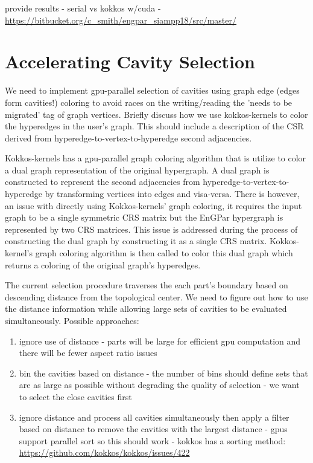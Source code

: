 \documentclass[graybox]{svmult}
\begin{document}
provide results - serial vs kokkos w/cuda -
\url{https://bitbucket.org/c_smith/engpar_siampp18/src/master/}

\section{Accelerating Cavity Selection} \label{sec:select}

We need to implement gpu-parallel selection of cavities using graph edge (edges
form cavities!) coloring to avoid races on the writing/reading the 'needs to be
migrated' tag of graph vertices.
Briefly discuss how we use kokkos-kernels to color the hyperedges in the user's graph.
This should include a description of the CSR derived from hyperedge-to-vertex-to-hyperedge
second adjacencies.

Kokkos-kernels has a gpu-parallel graph coloring algorithm that is utilize to color a dual graph representation of the original hypergraph. A dual graph is constructed to represent the second adjacencies from hyperedge-to-vertex-to-hyperedge by transforming vertices into edges and visa-versa. There is however, an issue with directly using Kokkos-kernels' graph coloring, it requires the input graph to be a single symmetric CRS matrix but the EnGPar hypergraph is represented by two CRS matrices. This issue is addressed during the process of constructing the dual graph by constructing it as a single CRS matrix. Kokkos-kernel's graph coloring algorithm is then called to color this dual graph which returns a coloring of the original graph's hyperedges.

The current selection procedure traverses the each part's boundary based on
descending distance from the topological center.
We need to figure out how to use the distance information while allowing large
sets of cavities to be evaluated simultaneously.
Possible approaches:
\begin{enumerate}
  \item ignore use of distance - parts will be large for efficient gpu
    computation and there will be fewer aspect ratio issues
  \item bin the cavities based on distance - the number of bins should define
    sets that are as large as possible without degrading the quality of
    selection - we want to select the close cavities first
  \item ignore distance and process all cavities simultaneously then apply a
    filter based on distance to remove the cavities with the largest distance -
    gpus support parallel sort so this should work - kokkos has a sorting
    method:
    \url{https://github.com/kokkos/kokkos/issues/422} \label{sortingSelect}
\end{enumerate}
\end{document}
